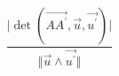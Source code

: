 \begin{displaymath}
  \frac{\vert\det(\overrightarrow{AA^\prime},\overrightarrow{u},\overrightarrow{u^\prime})\vert}
  {\Vert \overrightarrow{u}\wedge\overrightarrow{u^\prime}\Vert}
\end{displaymath}
